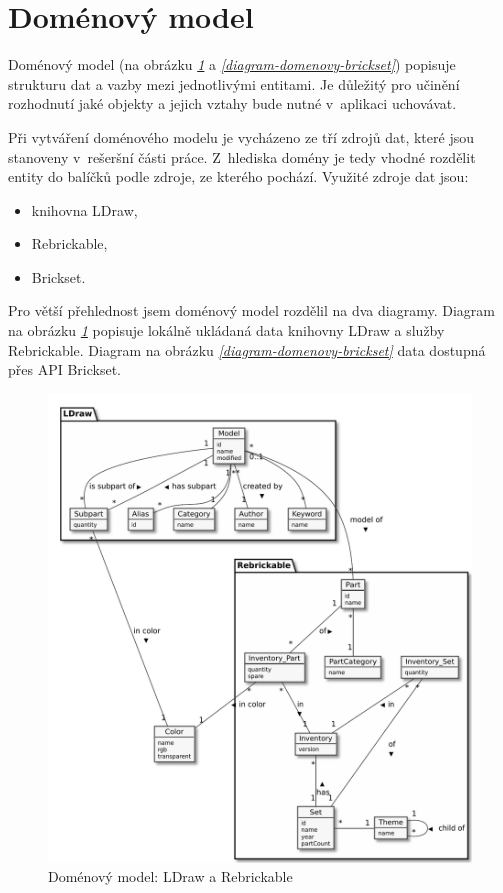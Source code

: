 \section{Doménový model}
Doménový model (na obrázku \emph{\ref{diagram-domenovy}} a \emph{\ref{diagram-domenovy-brickset}}) popisuje strukturu dat a vazby mezi jednotlivými entitami. Je důležitý pro učinění rozhodnutí jaké objekty a jejich vztahy bude nutné v~aplikaci uchovávat. 

Při vytváření doménového modelu je vycházeno ze tří zdrojů dat, které jsou stanoveny v~rešeršní části práce. Z~hlediska domény je tedy vhodné rozdělit entity do balíčků podle zdroje, ze kterého pochází. Využité zdroje dat jsou: 
\begin{itemize}
  \item knihovna LDraw,
  \item Rebrickable,
  \item Brickset.
\end{itemize}

Pro větší přehlednost jsem doménový model rozdělil na dva diagramy. Diagram na obrázku \emph{\ref{diagram-domenovy}} popisuje lokálně ukládaná data knihovny LDraw a služby Rebrickable. Diagram na obrázku \emph{\ref{diagram-domenovy-brickset}} data dostupná přes API Brickset. 

\begin{figure}[htbp]
    \centering
    \includegraphics[width=\textwidth,height=\textheight,keepaspectratio]{pdfs/domain_ldraw_rebrickable}
    \caption{Doménový model: LDraw a Rebrickable\label{diagram-domenovy}}
  \end{figure}

